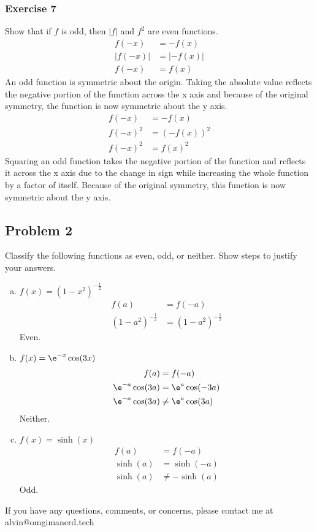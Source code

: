 \documentclass{math}
\begin{document}
\subsubsection*{Exercise 7}
Show that if \( f \) is odd, then \( |f| \) and \( f^2 \) are even functions.
\begin{align*}
  f(-x) &= -f(x) \\
  |f(-x)| &= |-f(x)| \\
  f(-x) &= f(x)
\end{align*}
An odd function is symmetric about the origin. Taking the absolute value
reflects the negative portion of the function across the x axis and because
of the original symmetry, the function is now symmetric about the y axis.
\begin{align*}
  f(-x) &= -f(x) \\
  f(-x)^2 &= (-f(x))^2 \\
  f(-x)^2 &= f(x)^2
\end{align*}
Squaring an odd function takes the negative portion of the function and reflects
it across the x axis due to the change in sign while increasing the whole
function by a factor of itself. Because of the original symmetry, this function
is now symmetric about the y axis.

\subsection*{Problem 2}
Classify the following functions as even, odd, or neither. Show steps to justify
your answers.
\begin{enumerate}[(a)]
  \item \( f(x) = (1-x^2)^{-\frac{1}{2}} \)
  \begin{align*}
    f(a) &= f(-a) \\
    (1-a^2)^{-\frac{1}{2}} &= (1-a^2)^{-\frac{1}{2}}
  \end{align*}
  Even.
  \item \( f(x) = \e^{-x}\cos(3x) \)
  \begin{align*}
    f(a) &= f(-a) \\
    \e^{-a}\cos(3a) &= \e^{a}\cos(-3a) \\
    \e^{-a}\cos(3a) &\ne \e^{a}\cos(3a) \\
  \end{align*}
  Neither.
  \item \( f(x) = \sinh(x) \)
  \begin{align*}
    f(a) &= f(-a) \\
    \sinh(a) &= \sinh(-a) \\
    \sinh(a) &\ne -\sinh(a)
  \end{align*}
  Odd.
\end{enumerate}

\begin{center}
  If you have any questions, comments, or concerns, please contact me at
  alvin@omgimanerd.tech
\end{center}
\end{document}
